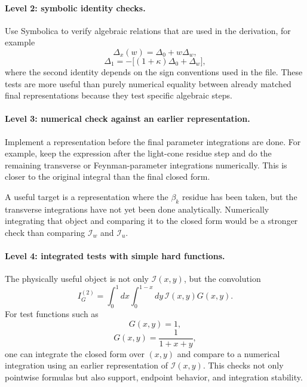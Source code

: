 \documentclass[11pt,a4paper]{article}
\begin{document}
\paragraph{Level 2: symbolic identity checks.}
Use Symbolica to verify algebraic relations that are used in the derivation, for example
\begin{equation}
  \Delta_x(w)=\Delta_0+w\Delta_w,
\end{equation}
\begin{equation}
  \Delta_1=-\bigl[(1+\kappa)\Delta_0+\Delta_w\bigr],
\end{equation}
where the second identity depends on the sign conventions used in the file. These tests are more useful than purely numerical equality between already matched final representations because they test specific algebraic steps.

\paragraph{Level 3: numerical check against an earlier representation.}
Implement a representation before the final parameter integrations are done. For example, keep the expression after the light-cone residue step and do the remaining transverse or Feynman-parameter integrations numerically. This is closer to the original integral than the final closed form.

A useful target is a representation where the \(\beta_k\) residue has been taken, but the transverse integrations have not yet been done analytically. Numerically integrating that object and comparing it to the closed form would be a stronger check than comparing \(\mathcal I_w\) and \(\mathcal I_u\).

\paragraph{Level 4: integrated tests with simple hard functions.}
The physically useful object is not only \(\mathcal I(x,y)\), but the convolution
\begin{equation}
  I_G^{(2)}=\int_0^1 dx\int_0^{1-x}dy\,\mathcal I(x,y)G(x,y).
\end{equation}
For test functions such as
\begin{equation}
  G(x,y)=1,
\end{equation}
\begin{equation}
  G(x,y)=\frac{1}{1+x+y},
\end{equation}
one can integrate the closed form over \((x,y)\) and compare to a numerical integration using an earlier representation of \(\mathcal I(x,y)\). This checks not only pointwise formulas but also support, endpoint behavior, and integration stability.
\end{document}
